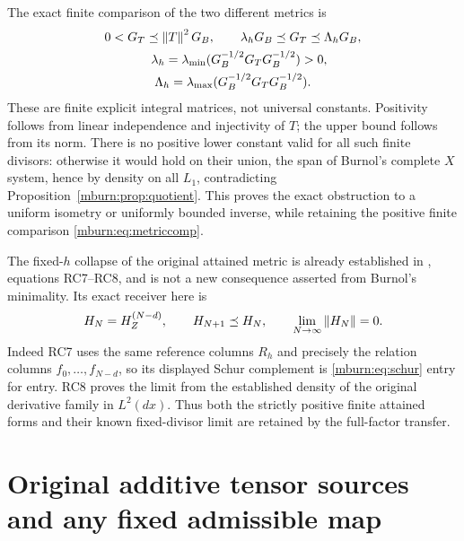 The exact finite comparison of the two different metrics is
\begin{equation}\label{mburn:eq:metriccomp}
 \begin{gathered}
 0<G_T\preceq\left\lVert T\right\rVert^2G_B,
 \qquad \lambda_hG_B\preceq G_T\preceq\Lambda_hG_B,\\
 \quad \lambda_h=\lambda_{\min}(G_B^{-1/2}G_TG_B^{-1/2})>0,
 \\
 \Lambda_h=\lambda_{\max}(G_B^{-1/2}G_TG_B^{-1/2}).
 \end{gathered}
\end{equation}
These are finite explicit integral matrices, not universal
constants. Positivity follows from linear independence and
injectivity of $T$; the upper bound follows from its norm.
There is no positive lower constant valid for all such finite
divisors: otherwise it would hold on their union, the span
of Burnol's complete $X$ system, hence by density on all
$L_1$, contradicting Proposition~\ref{mburn:prop:quotient}.
This proves the exact obstruction to a uniform isometry or
uniformly bounded inverse, while retaining the positive
finite comparison \eqref{mburn:eq:metriccomp}.

The fixed-$h$ collapse of the original attained metric is
already established in \cite{mburn:OriginalTheta}, equations
RC7--RC8, and is not a new consequence asserted from Burnol's
minimality. Its exact receiver here is
\[
 H_N=H_Z^{(N-d)},\qquad
 H_{N+1}\preceq H_N,\qquad
 \lim_{N\to\infty}\left\lVert H_N\right\rVert=0.
\]
Indeed RC7 uses the same reference columns $R_h$ and precisely
the relation columns $f_0,\ldots,f_{N-d}$, so its displayed
Schur complement is \eqref{mburn:eq:schur} entry for entry.
RC8 proves the limit from the established density of the
original derivative family in $L^2(dx)$. Thus both the
strictly positive finite attained forms and their known
fixed-divisor limit are retained by the full-factor transfer.

\section{Original additive tensor sources and any fixed admissible map}

